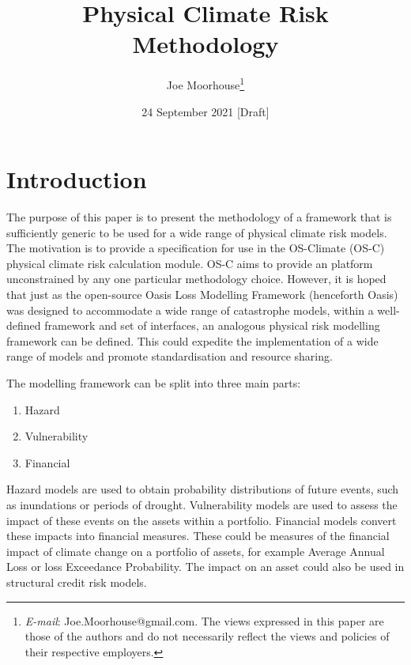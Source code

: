 \documentclass[a4paper,11pt]{extarticle} %
\title{Physical Climate Risk Methodology}
\author{Joe Moorhouse\thanks{\textit{E-mail}: Joe.Moorhouse@gmail.com.
    	\smallskip	    
	    \newline%
	The views expressed in this paper are those of the authors and do not necessarily reflect the views and policies of their respective employers.}
	}
\date{24 September 2021 [Draft]}
\begin{document}

\maketitle{}



\clearpage
\setcounter{tocdepth}{4}
\renewcommand{\contentsname}{Contents}
\tableofcontents




\clearpage
\section{Introduction}
\label{Sec:Introduction}

The purpose of this paper is to present the methodology of a framework that is sufficiently generic to be used for a wide range of physical climate risk models. The motivation is to provide a specification for use in the OS-Climate (OS-C) \cite{OSC} physical climate risk calculation module. OS-C aims to provide an platform unconstrained by any one particular methodology choice. However, it is hoped that just as the open-source Oasis Loss Modelling Framework \cite{OasisLMF} (henceforth Oasis) was designed to accommodate a wide range of catastrophe models, within a well-defined framework and set of interfaces, an analogous physical risk modelling framework can be defined. This could expedite the implementation of a wide range of models and promote standardisation and resource sharing.

The modelling framework can be split into three main parts:

\begin{enumerate}
	\item Hazard 
	\item Vulnerability 
	\item Financial 
\end{enumerate}

Hazard models are used to obtain probability distributions of future events, such as inundations or periods of drought. Vulnerability models are used to assess the impact of these events on the assets within a portfolio. Financial models convert these impacts into financial measures. These could be measures of the financial impact of climate change on a portfolio of assets, for example Average Annual Loss or loss Exceedance Probability. The impact on an asset could also be used in structural credit risk models. 
\end{document}
